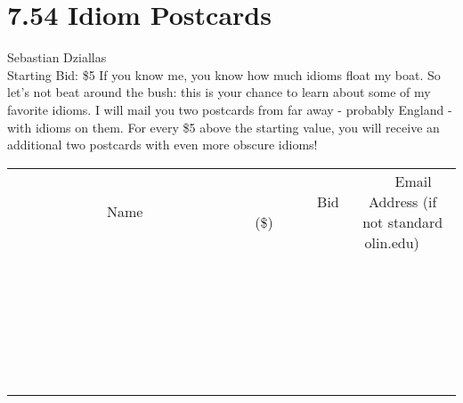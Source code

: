 \documentclass[11pt]{article}
\begin{document}
\section*{7.54 Idiom Postcards}
Sebastian Dziallas
\\
Starting Bid: \$5
\newline
If you know me, you know how much idioms float my boat. So let's not beat around the bush: this is your chance to learn about some of my favorite idioms. I will mail you two postcards from far away - probably England - with idioms on them. For every \$5 above the starting value, you will receive an additional two postcards with even more obscure idioms!
\\[6ex]
\begin{tabular}{c c c}
~~~~~~~~~~~~~Name~~~~~~~~~~~~~ & ~~~~~~~~~Bid (\$)~~~~~~~~~  & ~~~Email Address (if not standard olin.edu)~~~\\
 & & \\
\hline
 & & \\
\hline
 & & \\
\hline
 & & \\
\hline
 & & \\
\hline
 & & \\
\hline
 & & \\
\hline
 & & \\
\hline
 & & \\
\hline
 & & \\
\hline
 & & \\
\hline
 & & \\
\hline
 & & \\
\hline
 & & \\
\hline
 & & \\
\hline
 & & \\
\hline
 & & \\
\hline
 & & \\
\hline
 & & \\
\hline
 & & \\
\hline
 & & \\
\hline
 & & \\
\hline
 & & \\
\hline
 & & \\
\hline
 & & \\
\hline
 & & \\
\hline
\end{tabular}
\newpage
\end{document}
